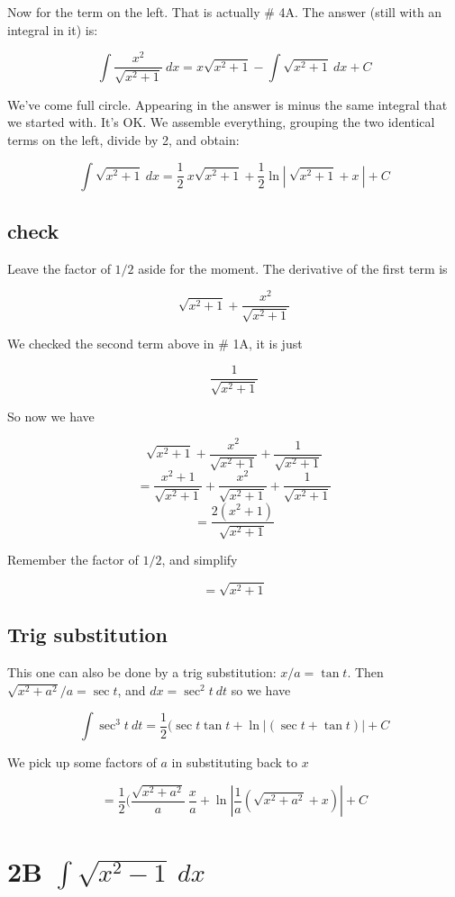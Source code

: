 \documentclass[11pt, oneside]{article}
\begin{document}
Now for the term on the left.  That is actually \# 4A.  The answer (still with an integral in it) is:

\[ \int \frac{x^2}{\sqrt{x^2 + 1}} \ dx = x \sqrt{x^2 + 1} - \int \sqrt{x^2 + 1} \ dx + C \]

We've come full circle.  Appearing in the answer is minus the same integral that we started with.  It's OK.  We assemble everything, grouping the two identical terms on the left, divide by 2, and obtain:

\[ \int \sqrt{x^2 + 1} \ dx = \frac{1}{2} \ x \sqrt{x^2 + 1} + \frac{1}{2} \ln |\ \sqrt{x^2 + 1} + x \ | + C \] 

\subsection*{check}

Leave the factor of $1/2$ aside for the moment.  The derivative of the first term is

\[ \sqrt{x^2 + 1} + \frac{x^2}{\sqrt{x^2 + 1}} \]

We checked the second term above in \# 1A, it is just

\[ \frac{1}{\sqrt{x^2 + 1}} \]

So now we have 

\[ \sqrt{x^2 + 1} + \frac{x^2}{\sqrt{x^2 + 1}} +  \frac{1}{\sqrt{x^2 + 1}} \]
\[ = \frac{x^2 + 1}{\sqrt{x^2 + 1}} + \frac{x^2}{\sqrt{x^2 + 1}} +  \frac{1}{\sqrt{x^2 + 1}} \]
\[ = \frac{2(x^2 + 1)}{\sqrt{x^2 + 1}} \]

Remember the factor of $1/2$, and simplify

\[ = \sqrt{x^2 + 1} \]

\subsection*{Trig substitution}


This one can also be done by a trig substitution:  $x/a = \tan t$.  Then $\sqrt{x^2 + a^2}/a = \sec t$, and $dx = \sec^2 t \ dt$ so we have

\[ \int \sec^3 t \ dt = \frac{1}{2} (\sec t \tan t + \ln | (\sec t + \tan t) | + C \]

We pick up some factors of $a$ in substituting back to $x$

\[ = \frac{1}{2} (\frac{\sqrt{x^2 + a^2}}{a} \ \frac{x}{a} + \ln | \frac{1}{a} (\sqrt{x^2 + a^2} + x) | + C \]

\section*{2B $\int \sqrt{x^2 - 1} \ dx$}
\end{document}
